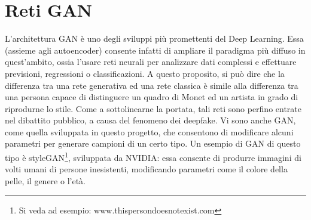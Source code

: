 \documentclass[a4paper]{article}
\begin{document}
\section{Reti GAN}
L'architettura GAN è uno degli sviluppi più promettenti del Deep Learning. Essa (assieme agli autoencoder) consente infatti di ampliare il paradigma più diffuso in quest'ambito, ossia l'usare reti neurali per analizzare dati complessi e effettuare previsioni, regressioni o classificazioni. A questo proposito, si può dire che la differenza tra una rete generativa ed una rete classica è simile alla differenza tra una persona capace di distinguere un quadro di Monet ed un artista in grado di riprodurne lo stile. Come a sottolinearne la portata, tali reti sono perfino entrate nel dibattito pubblico, a causa del fenomeno dei deepfake. Vi sono anche GAN, come quella sviluppata in questo progetto, che consentono di modificare alcuni parametri per generare campioni di un certo tipo. Un esempio di GAN di questo tipo è styleGAN\footnote{Si veda ad esempio: www.thispersondoesnotexist.com}, sviluppata da NVIDIA: essa consente di produrre immagini di volti umani di persone inesistenti, modificando parametri come il colore della pelle, il genere o l'età.\cite{stylegan}\\
\end{document}
